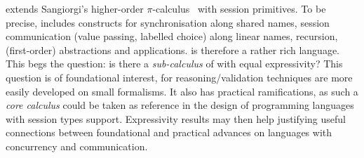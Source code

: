 
  \HOp %
extends Sangiorgi's higher-order $\pi$-calculus~\cite{SangiorgiD:expmpa} with session primitives.
To be precise, %
\HOp
includes
constructs for 
synchronisation along shared names, 
session communication (value passing, labelled choice) along linear names,
recursion, 
 (first-order) abstractions %
 and applications.
\HOp is therefore a rather rich language. This begs the question:
is there a \emph{sub-calculus} of \HOp with equal expressivity? %
This question is of foundational interest, 
for reasoning/validation techniques are more easily developed on small formalisms. 
It also has practical ramifications, 
as such a \emph{core calculus} could be taken as reference in 
the design of %
programming languages with session types support.
Expressivity results may then help justifying useful connections 
between foundational and practical advances on languages with concurrency and communication.



